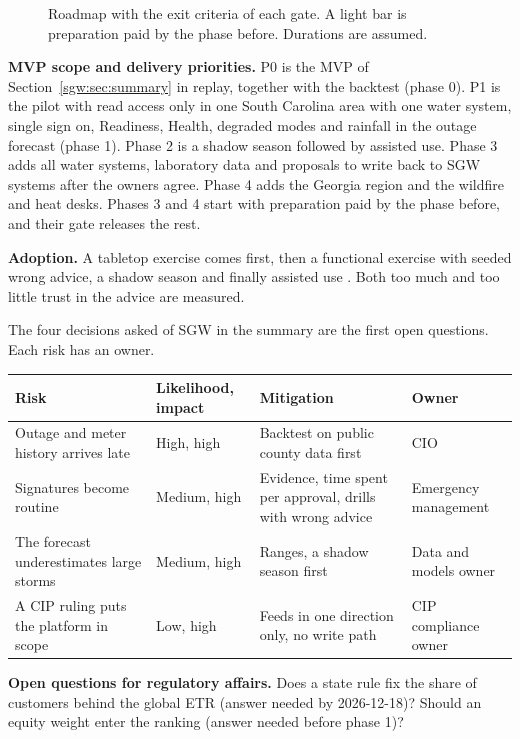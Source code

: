 \documentclass[fontsize=10pt,a4paper,DIV=12,parskip=half-,numbers=noenddot,headsepline,captions=tableheading]{scrartcl}
\begin{document}
\begin{figure}[H]
  \centering
  \resizebox{0.8\textwidth}{!}{}
  \caption{Roadmap with the exit criteria of each gate. A light bar is preparation paid by the phase before. Durations are assumed.}
  \label{fig:roadmap}
\end{figure}

\textbf{MVP scope and delivery priorities.} P0 is the MVP of Section~\ref{sgw:sec:summary} in replay, together with the backtest (phase 0). P1 is the pilot with read access only in one South Carolina area with one water system, single sign on, Readiness, Health, degraded modes and rainfall in the outage forecast (phase 1). Phase 2 is a shadow season followed by assisted use. Phase 3 adds all water systems, laboratory data and proposals to write back to SGW systems after the owners agree. Phase 4 adds the Georgia region and the wildfire and heat desks. Phases 3 and 4 start with preparation paid by the phase before, and their gate releases the rest.

\textbf{Adoption.} A tabletop exercise comes first, then a functional exercise with seeded wrong advice, a shadow season and finally assisted use \citep{fema_hseep}. Both too much and too little trust in the advice are measured.

The four decisions asked of SGW in the summary are the first open questions. Each risk has an owner.
{\footnotesize\par\noindent
\begin{tabularx}{\textwidth}{@{}L{5.0cm} L{2.0cm} Y L{3.4cm}@{}}
  \toprule
  \textbf{Risk} & \textbf{Likelihood, impact} & \textbf{Mitigation} & \textbf{Owner} \\ \midrule
  Outage and meter history arrives late & High, high & Backtest on public county data first & CIO \\ \lightrowrule
  Signatures become routine & Medium, high & Evidence, time spent per approval, drills with wrong advice & Emergency management \\ \lightrowrule
  The forecast underestimates large storms & Medium, high & Ranges, a shadow season first & Data and models owner \\ \lightrowrule
  A CIP ruling puts the platform in scope & Low, high & Feeds in one direction only, no write path & CIP compliance owner \\ \bottomrule
\end{tabularx}}

\textbf{Open questions for regulatory affairs.} Does a state rule fix the share of customers behind the global ETR (answer needed by 2026-12-18)? Should an equity weight enter the ranking (answer needed before phase 1)?

{\footnotesize}
\end{document}
